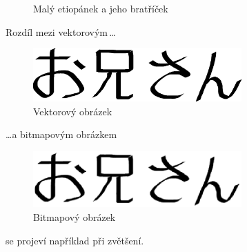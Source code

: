 \documentclass[a4paper, 11pt]{article}[01.04.2012]
\begin{document}
\begin{figure}[h]
  \caption{Malý etiopánek a jeho bratříček}
  \label{etiopan}
\end{figure}
\newpage
Rozdíl mezi vektorovým\,\dots
\begin{figure}[H]
  \centering
  \includegraphics[width=8cm]{oniisan.eps}
  \caption{Vektorový obrázek}
  \label{vektor}
\end{figure}

\dots a bitmapovým obrázkem
\begin{figure}[H]
  \centering
  \includegraphics[width=8cm]{oniisan2.eps}
  \caption{Bitmapový obrázek}
  \label{rastr}
\end{figure}
se projeví například při zvětšení.
\end{document}
